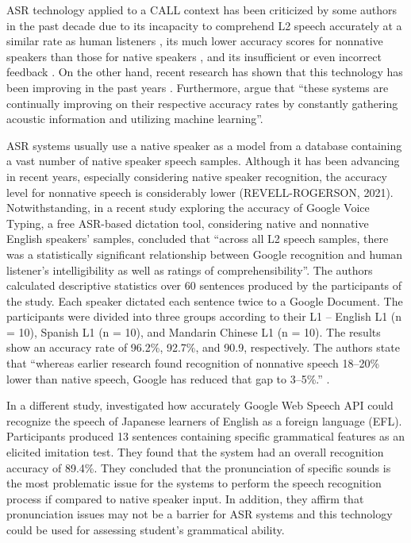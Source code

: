 \documentclass[english]{textolivre}
\begin{document}
ASR technology applied to a CALL context has been criticized by some authors in the past decade due to its incapacity to comprehend L2 speech accurately at a similar rate as human listeners \cite{derwing_does_2000, kim_automatic_2006, levis_2013}, its much lower accuracy scores for nonnative speakers than those for native speakers \cite{ashwell_how_2017, rogerson-revell_computer-assisted_2021}, and its insufficient or even incorrect feedback \cite{chen_developing_2011, demenko_use_2010, levis_2013, rogerson-revell_computer-assisted_2021}. On the other hand, recent research has shown that this technology has been improving in the past years \cite{ashwell_how_2017, Dizon2020EvaluatingIP, dizon_intelligent_2020, mccrocklin_revisiting_2020, moussalli_intelligent_2020, bogach_speech_2021}. Furthermore, \textcite[p. 61]{ashwell_how_2017} argue that “these systems are continually improving on their respective accuracy rates by constantly gathering acoustic information and utilizing machine learning”.

ASR systems usually use a native speaker as a model from a database containing a vast number of native speaker speech samples. Although it has been advancing in recent years, especially considering native speaker recognition, the accuracy level for nonnative speech is considerably lower (REVELL-ROGERSON, 2021). Notwithstanding, in a recent study exploring the accuracy of Google Voice Typing, a free ASR-based dictation tool, considering native and nonnative English speakers’ samples, \textcite[p. 1092]{mccrocklin_revisiting_2020} concluded that “across all L2 speech samples, there was a statistically significant relationship between Google recognition and human listener’s intelligibility as well as ratings of comprehensibility”. The authors calculated descriptive statistics over 60 sentences produced by the participants of the study. Each speaker dictated each sentence twice to a Google Document. The participants were divided into three groups according to their L1 – English L1 (n = 10), Spanish L1 (n = 10), and Mandarin Chinese L1 (n = 10). The results show an accuracy rate of 96.2\%, 92.7\%, and 90.9, respectively. The authors state that “whereas earlier research found recognition of nonnative speech 18–20\% lower than native speech, Google has reduced that gap to 3–5\%.” \cite[p. 1094]{mccrocklin_revisiting_2020}.

In a different study, \textcite{ashwell_how_2017} investigated how accurately Google Web Speech API could recognize the speech of Japanese learners of English as a foreign language (EFL). Participants produced 13 sentences containing specific grammatical features as an elicited imitation test. They found that the system had an overall recognition accuracy of 89.4\%. They concluded that the pronunciation of specific sounds is the most problematic issue for the systems to perform the speech recognition process if compared to native speaker input. In addition, they affirm that pronunciation issues may not be a barrier for ASR systems and this technology could be used for assessing student’s grammatical ability.
\end{document}
